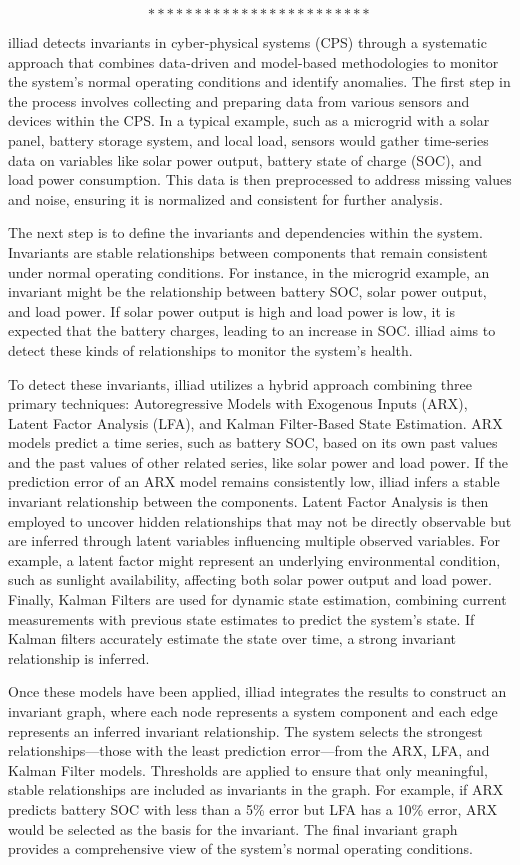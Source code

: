$$************************$$

illiad detects invariants in cyber-physical systems (CPS) through a systematic approach that combines data-driven and model-based methodologies to monitor the system's normal operating conditions and identify anomalies. The first step in the process involves collecting and preparing data from various sensors and devices within the CPS. In a typical example, such as a microgrid with a solar panel, battery storage system, and local load, sensors would gather time-series data on variables like solar power output, battery state of charge (SOC), and load power consumption. This data is then preprocessed to address missing values and noise, ensuring it is normalized and consistent for further analysis.

The next step is to define the invariants and dependencies within the system. Invariants are stable relationships between components that remain consistent under normal operating conditions. For instance, in the microgrid example, an invariant might be the relationship between battery SOC, solar power output, and load power. If solar power output is high and load power is low, it is expected that the battery charges, leading to an increase in SOC. illiad aims to detect these kinds of relationships to monitor the system's health.

To detect these invariants, illiad utilizes a hybrid approach combining three primary techniques: Autoregressive Models with Exogenous Inputs (ARX), Latent Factor Analysis (LFA), and Kalman Filter-Based State Estimation. ARX models predict a time series, such as battery SOC, based on its own past values and the past values of other related series, like solar power and load power. If the prediction error of an ARX model remains consistently low, illiad infers a stable invariant relationship between the components. Latent Factor Analysis is then employed to uncover hidden relationships that may not be directly observable but are inferred through latent variables influencing multiple observed variables. For example, a latent factor might represent an underlying environmental condition, such as sunlight availability, affecting both solar power output and load power. Finally, Kalman Filters are used for dynamic state estimation, combining current measurements with previous state estimates to predict the system's state. If Kalman filters accurately estimate the state over time, a strong invariant relationship is inferred.

Once these models have been applied, illiad integrates the results to construct an invariant graph, where each node represents a system component and each edge represents an inferred invariant relationship. The system selects the strongest relationships—those with the least prediction error—from the ARX, LFA, and Kalman Filter models. Thresholds are applied to ensure that only meaningful, stable relationships are included as invariants in the graph. For example, if ARX predicts battery SOC with less than a 5\% error but LFA has a 10\% error, ARX would be selected as the basis for the invariant. The final invariant graph provides a comprehensive view of the system's normal operating conditions.

